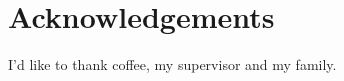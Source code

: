 \begingroup
\let\clearpage\relax
\let\cleardoublepage\relax
\let\cleardoublepage\relax
\chapter*{Acknowledgements}
I'd like to thank coffee, my supervisor and my family.
\endgroup
